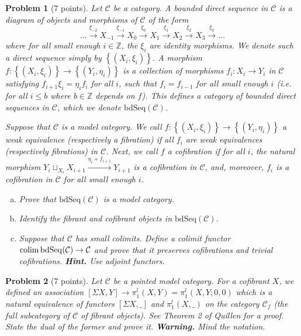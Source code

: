 \documentclass[12pt]{article}
\newcommand\ZZ{\mathbb{Z}}
\newcommand\CCC{\mathcal{C}}
\newcommand{\setof}[1]{\left\{#1\right\}}
\newcommand\lqs{\leqslant}
\newcommand\bdsc{{\mathrm{bdSeq}}({\mathcal C})}
\newcommand\colim{\qopname\relax n{colim}}
\newtheorem{problem}{Problem}}
\begin{document}
\begin{problem}[7 points]
  Let $\CCC$ be a category. A bounded direct sequence in $\CCC$ is a diagram of objects and morphisms of $\CCC$ of the form
  \begin{equation*}
    \dots \xrightarrow{\xi_{-2}} X_{-1}
    \xrightarrow{\xi_{-1}} X_0
    \xrightarrow{\xi_0} X_1
    \xrightarrow{\xi_1} X_2
    \xrightarrow{\xi_2} X_3
    \xrightarrow{\xi_3}
    \dots
  \end{equation*}
  where for all small enough $i\in\ZZ$, the $\xi_i$ are identity morphisms. We denote such
  a direct sequence simply by $\setof{(X_i,\xi_i)}$. A morphism
  $f\colon\setof{(X_i,\xi_i)}\to\setof{(Y_i,\eta_i)}$ is a collection of morphisms
  $f_i\colon X_i\to Y_i$ in $\CCC$ satisfying $f_{i+1}\xi_i=\eta_if_i$ for all $i$, such
  that $f_i=f_{i-1}$ for all small enough $i$ (i.e. for all $i\lqs b$ where $b\in\ZZ$
  depends on $f$). This defines a category of bounded direct sequences in $\CCC$, which we
  denote $\bdsc$.

  Suppose that $\CCC$ is a model category. We call $f\colon\setof{(X_i,\xi_i)}\to\setof{(Y_i,\eta_i)}$ a weak equivalence
  (respectively a fibration) if all $f_i$ are weak equivalences (respectively fibrations) in $\CCC$. Next, we call $f$ a cofibration
  if for all $i$, the natural morphism $Y_i\sqcup_{X_i}X_{i+1}\xrightarrow{\eta_i+f_{i+1}}Y_{i+1}$ is a cofibration in $\CCC$, and, moreover, $f_i$ is
  a cofibration in $\CCC$ for all small enough $i$.
  \begin{enumerate}[(a)]
  \item   Prove that $\bdsc$ is a model category.
  \item   Identify the fibrant and cofibrant objects in $\bdsc$.
  \item   Suppose that $\CCC$ has small colimits. Define a colimit functor $\colim\bdsc\to\CCC$ and prove that
    it preserves cofibrations and trivial cofibrations. {\bf Hint.} Use adjoint functors.
  \end{enumerate}
\end{problem}

\begin{problem}[7 points]
  Let $\CCC$ be a pointed model category. For a cofibrant $X$, we defined an association
  $[\Sigma X,Y]\to\pi_1^l(X,Y)=\pi_1^l(X,Y;0,0)$ which is a natural equivalence of
  functors $[\Sigma X,\_]$ and $\pi_1^l(X,\_)$ on the category $\CCC_f$ (the full
  subcategory of $\CCC$ of fibrant objects). See Theorem 2 of Quillen \cite{quillen} for a
  proof. State the dual of the former and prove it. \textbf{Warning.} Mind the notation.
\end{problem}
\end{document}

